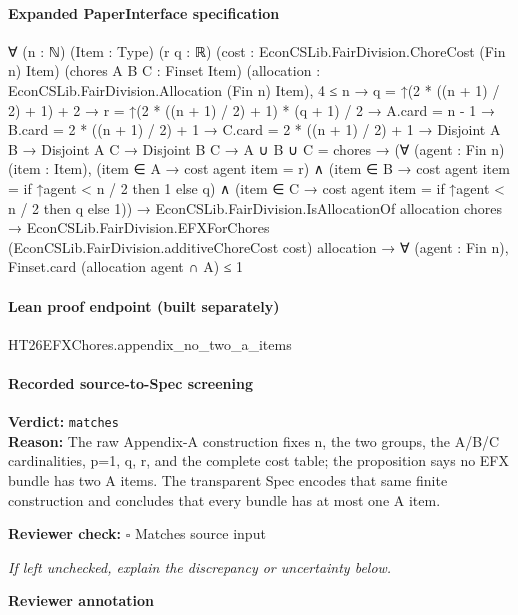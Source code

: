 \documentclass[10pt]{article}
\newcommand{\reviewerbox}{%
  \par\noindent\fbox{\parbox{0.96\linewidth}{\rule{0pt}{0.38in}}}\par
}
\newcommand{\reviewmatch}[1]{%
  \par\noindent\textbf{Reviewer check:} $\square$\; #1\par
  \noindent\emph{If left unchecked, explain the discrepancy or uncertainty below.}\par
}
\begin{document}
\paragraph{Expanded PaperInterface specification}
\begin{ReviewVerbatim}
∀ (n : ℕ) (Item : Type) (r q : ℝ) (cost : EconCSLib.FairDivision.ChoreCost (Fin n) Item) (chores A B C : Finset Item)
  (allocation : EconCSLib.FairDivision.Allocation (Fin n) Item),
  4 ≤ n →
    q = ↑(2 * ((n + 1) / 2) + 1) + 2 →
      r = ↑(2 * ((n + 1) / 2) + 1) * (q + 1) / 2 →
        A.card = n - 1 →
          B.card = 2 * ((n + 1) / 2) + 1 →
            C.card = 2 * ((n + 1) / 2) + 1 →
              Disjoint A B →
                Disjoint A C →
                  Disjoint B C →
                    A ∪ B ∪ C = chores →
                      (∀ (agent : Fin n) (item : Item),
                          (item ∈ A → cost agent item = r) ∧
                            (item ∈ B → cost agent item = if ↑agent < n / 2 then 1 else q) ∧
                              (item ∈ C → cost agent item = if ↑agent < n / 2 then q else 1)) →
                        EconCSLib.FairDivision.IsAllocationOf allocation chores →
                          EconCSLib.FairDivision.EFXForChores (EconCSLib.FairDivision.additiveChoreCost cost)
                              allocation →
                            ∀ (agent : Fin n), Finset.card (allocation agent ∩ A) ≤ 1
\end{ReviewVerbatim}

\paragraph{Lean proof endpoint (built separately)}\begin{ReviewVerbatim}
HT26EFXChores.appendix_no_two_a_items
\end{ReviewVerbatim}

\paragraph{Recorded source-to-Spec screening}
\textbf{Verdict:} \texttt{matches}
\\
\textbf{Reason:} The raw Appendix-A construction fixes n, the two groups, the A/B/C cardinalities, p=1, q, r, and the complete cost table; the proposition says no EFX bundle has two A items. The transparent Spec encodes that same finite construction and concludes that every bundle has at most one A item.
\reviewmatch{Matches source input}
\noindent\textbf{Reviewer annotation}\par
\reviewerbox
\clearpage
\hypertarget{source-claim-18b6e05d84d21367}{}
\end{document}
